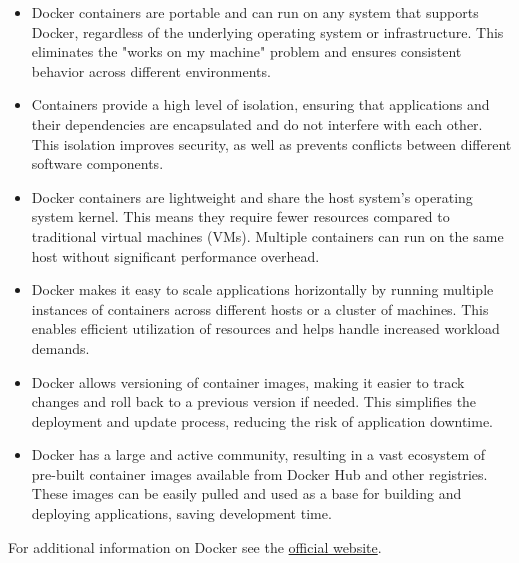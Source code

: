 \begin{itemize}
  \item Docker containers are portable and can run on any system that supports Docker, regardless of the underlying operating system or infrastructure. This eliminates the "works on my machine" problem and ensures consistent behavior across different environments.
  \item Containers provide a high level of isolation, ensuring that applications and their dependencies are encapsulated and do not interfere with each other. This isolation improves security, as well as prevents conflicts between different software components.
  \item Docker containers are lightweight and share the host system's operating system kernel. This means they require fewer resources compared to traditional virtual machines (VMs). Multiple containers can run on the same host without significant performance overhead.
  \item Docker makes it easy to scale applications horizontally by running multiple instances of containers across different hosts or a cluster of machines. This enables efficient utilization of resources and helps handle increased workload demands.
  \item Docker allows versioning of container images, making it easier to track changes and roll back to a previous version if needed. This simplifies the deployment and update process, reducing the risk of application downtime.
  \item Docker has a large and active community, resulting in a vast ecosystem of pre-built container images available from Docker Hub and other registries. These images can be easily pulled and used as a base for building and deploying applications, saving development time.
\end{itemize}
For additional information on Docker see the \href{https://www.docker.com/}{official website}.
